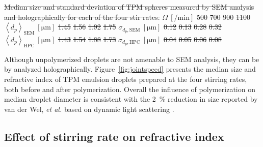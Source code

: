 \documentclass[journal=langd5,manuscript=article]{achemso}
\newcommand{\avg}[1]{\left< #1 \right>}
\providecommand{\DIFdel}[1]{{\protect\color{red}\sout{#1}}}                      %
\providecommand{\DIFdelbegin}{} %
\providecommand{\DIFdelend}{} %
\providecommand{\DIFdelFL}[1]{\DIFdel{#1}} %
\begin{document}
\DIFdelbegin %
{%
\DIFdelFL{Median size and standard deviation of TPM spheres
  measured by SEM analysis 
  and holographically for each of the four stir rates.}}
\DIFdelFL{$\Omega~[\si{\per\minute}]$ }%
\DIFdelFL{\num{500} }%
\DIFdelFL{\num{700}}%
\DIFdelFL{\num{900} }%
\DIFdelFL{\num{1100} }%
\DIFdelFL{$\avg{d_p}_{\text{SEM}}~[\si{\um}]$ }%
\DIFdelFL{1.45 }%
\DIFdelFL{1.56 }%
\DIFdelFL{1.92 }%
\DIFdelFL{1.75 }%
\DIFdelFL{$\sigma_{d_p, \text{SEM}}~[\si{\um}]$ }%
\DIFdelFL{0.12 }%
\DIFdelFL{0.13 }%
\DIFdelFL{0.28 }%
\DIFdelFL{0.32 }%
\DIFdelFL{$\avg{d_p}_{\text{HPC}}~[\si{\um}]$ }%
\DIFdelFL{1.43 }%
\DIFdelFL{1.54 }%
\DIFdelFL{1.88 }%
\DIFdelFL{1.73 }%
\DIFdelFL{$\sigma_{d_p, \text{HPC}}~[\si{\um}]$ }%
\DIFdelFL{0.04 }%
\DIFdelFL{0.05 }%
\DIFdelFL{0.06 }%
\DIFdelFL{0.08 }%

\DIFdelend Although unpolymerized droplets are not amenable to SEM analysis,
they can be by analyzed holographically.
Figure~\ref{fig:jointspeed} presents the median size and refractive index
of TPM emulsion droplets prepared at the four stirring rates,
both before and after polymerization.
Overall the influence of polymerization on median droplet diameter is
consistent with the \SI{2}{\percent} reduction in size reported by
van der Wel, \emph{et al.}
based on dynamic light scattering \cite{vanderwel17}.

\subsection{Effect of stirring rate on refractive index}
\label{sec:stirindex}
\end{document}
